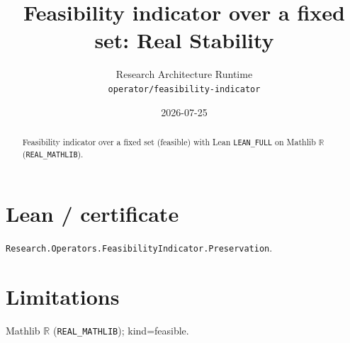 \documentclass[11pt]{article}
\title{Feasibility indicator over a fixed set: Real Stability}
\author{Research Architecture Runtime \\ \texttt{operator/feasibility-indicator}}
\date{2026-07-25}
\begin{document}
\maketitle
\begin{abstract}
Feasibility indicator over a fixed set (feasible) with Lean \texttt{LEAN\_FULL} on Mathlib $\mathbb{R}$ (\texttt{REAL\_MATHLIB}).
\end{abstract}
\section{Lean / certificate}
\texttt{Research.Operators.FeasibilityIndicator.Preservation}.
\section{Limitations}
Mathlib $\mathbb{R}$ (\texttt{REAL\_MATHLIB}); kind=feasible.
\end{document}
